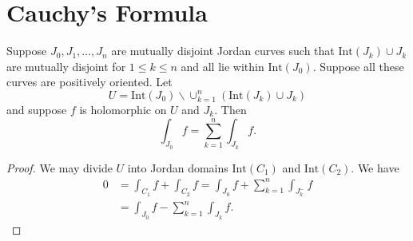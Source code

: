 \section{Cauchy's Formula}
\begin{theorem}
Suppose $J_0, J_1, \dots, J_n$ are mutually disjoint Jordan curves such that
$\mathrm{Int}(J_k) \cup J_k$ are mutually disjoint for $1 \leq k \leq n$
and all lie within $\mathrm{Int}(J_0)$. Suppose all these curves are positively
oriented. Let
$$
U = \mathrm{Int}(J_0)
    \backslash
    \cup_{k=1}^n( \mathrm{Int}(J_k) \cup J_k)
$$
and suppose $f$ is holomorphic on $U$ and $J_k$.
Then
$$
\int_{J_0} f = \sum_{k=1}^n \int_{J_k} f.
$$
\end{theorem}
\begin{proof}
We may divide $U$ into Jordan domains $\mathrm{Int}(C_1)$ and
$\mathrm{Int}(C_2)$. We have
\begin{align*}
0 &= \int_{C_1} f + \int_{C_2} f
   = \int_{J_0} f + \sum_{k=1}^n \int_{J_k^{-}} f \\
  &= \int_{J_0} f - \sum_{k=1}^n \int_{J_k} f.
\end{align*}
\end{proof}

